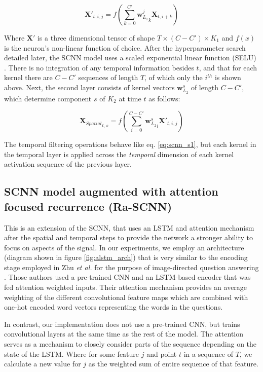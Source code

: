 \documentclass[fleqn,10pt]{wlscirep}
\begin{document}
\begin{equation} \label{eq:scnn_s1}
  \boldsymbol{X'}_{t, i, j} = f\left(\sum_{k=0}^{C'} {\boldsymbol{w}_{L_1}^j}_k \boldsymbol{X}_{t,i+k}\right)
\end{equation}

Where $\boldsymbol{X'}$ is a three dimensional tensor of shape $T \times (C-C') \times K_1$ and $f(x)$ is the neuron's non-linear function of choice. After the hyperparameter search detailed later, the SCNN model uses a scaled exponential linear function (SELU) \cite{NIPS2017_6698}. There is no integration of any temporal information besides $t$, and that for each kernel there are $C-C'$ sequences of length $T$, of which only the $i^{th}$ is shown above. Next, the second layer consists of kernel vectors $\boldsymbol{w}_{L_2}^s$ of length $C-C'$, which determine component $s$ of $K_2$ at time $t$ as follows:

\begin{equation} \label{eq:scnn_s2}
  {\boldsymbol{X}_{Spatial}}_{t, s} = f\left(\sum_{i=0}^{C-C'}{\boldsymbol{w}_{L_2}^s}_i \boldsymbol{X'}_{t, i, j}\right)
\end{equation}

The temporal filtering operations behave like eq. \ref{eq:scnn_s1}, but each kernel in the temporal layer is applied across the {\em temporal} dimension of each kernel activation sequence of the previous layer.

\subsection*{SCNN model augmented with attention focused recurrence (Ra-SCNN)} 

This is an extension of the SCNN, that uses an LSTM and attention mechanism after the spatial and temporal steps to provide the network a stronger ability to focus on aspects of the signal. In our experiments, we employ an architecture (diagram shown in figure \ref{fig:alstm_arch}) that is very similar to the encoding stage employed in Zhu {\em et al.} for the purpose of image-directed question answering \cite{Zhu}. Those authors used a pre-trained CNN and an LSTM-based encoder that was fed attention weighted inputs. Their attention mechanism provides an average weighting of the different convolutional feature maps which are combined with one-hot encoded word vectors representing the words in the questions.

In contrast, our implementation does not use a pre-trained CNN, but trains convolutional layers at the same time as the rest of the model. The attention serves as a mechanism to closely consider parts of the sequence depending on the state of the LSTM. Where for some feature $j$ and point $t$ in a sequence of $T$, we calculate a new value for $j$ as the weighted sum of entire sequence of that feature.  
\end{document}
